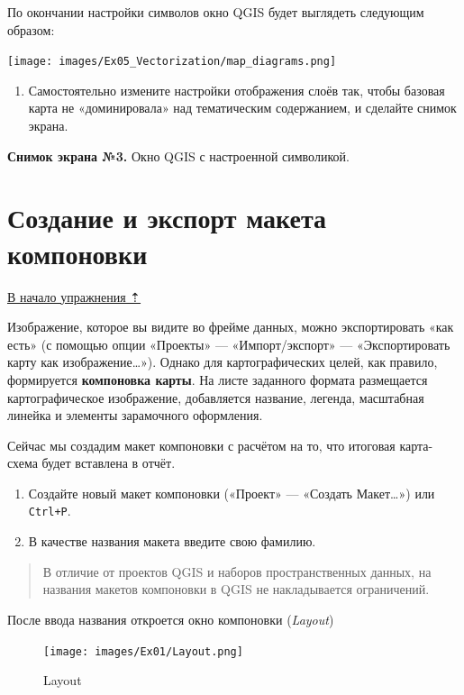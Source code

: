 \documentclass[
  12pt,
]{book}
\providecommand{\tightlist}{%
  \setlength{\itemsep}{0pt}\setlength{\parskip}{0pt}}
\begin{document}
По окончании настройки символов окно QGIS будет выглядеть следующим образом:

\texttt{[image: images/Ex05\_Vectorization/map\_diagrams.png]}

\begin{enumerate}
\def\labelenumi{\arabic{enumi}.}
\setcounter{enumi}{10}
\tightlist
\item
  Самостоятельно измените настройки отображения слоёв так, чтобы базовая карта не «доминировала» над тематическим содержанием, и сделайте снимок экрана.
\end{enumerate}

\textbf{Снимок экрана №3.} Окно QGIS с настроенной символикой.

\hypertarget{digitizing-layout}{%
\section{Создание и экспорт макета компоновки}\label{digitizing-layout}}

\protect\hyperlink{digitizing-districts}{В начало упражнения ⇡}

Изображение, которое вы видите во фрейме данных, можно экспортировать «как есть» (с помощью опции «Проекты» --- «Импорт/экспорт» --- «Экспортировать карту как изображение\ldots»). Однако для картографических целей, как правило, формируется \textbf{компоновка карты}. На листе заданного формата размещается картографическое изображение, добавляется название, легенда, масштабная линейка и элементы зарамочного оформления.

Сейчас мы создадим макет компоновки с расчётом на то, что итоговая карта-схема будет вставлена в отчёт.

\begin{enumerate}
\def\labelenumi{\arabic{enumi}.}
\item
  Создайте новый макет компоновки («Проект» --- «Создать Макет\ldots») или \texttt{Ctrl+P}.
\item
  В качестве названия макета введите свою фамилию.
\end{enumerate}

\begin{quote}
В отличие от проектов QGIS и наборов пространственных данных, на названия макетов компоновки в QGIS не накладывается ограничений.
\end{quote}

После ввода названия откроется окно компоновки (\emph{Layout})

\begin{figure}
\centering
\texttt{[image: images/Ex01/Layout.png]}
\caption{Layout}
\end{figure}
\end{document}

